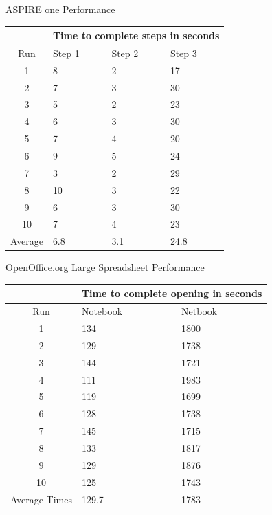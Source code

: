 \documentclass{beamer}
\begin{document}
\begin{frame}{ASPIRE one Performance}
  \begin{tabularx}{275pt}{| c | X | X | X |}
    \hline
    & \multicolumn{3}{c|}{Time to complete steps in seconds} \\ \hline
    Run          & Step 1 & Step 2 & Step 3 \\ \hline
    1            & 8      & 2      & 17     \\ \hline
    2            & 7      & 3      & 30     \\ \hline
    3            & 5      & 2      & 23     \\ \hline
    4            & 6      & 3      & 30     \\ \hline
    5            & 7      & 4      & 20     \\ \hline
    6            & 9      & 5      & 24     \\ \hline
    7            & 3      & 2      & 29     \\ \hline
    8            & 10     & 3      & 22     \\ \hline
    9            & 6      & 3      & 30     \\ \hline
    10           & 7      & 4      & 23     \\ \hline
    Average      & 6.8    & 3.1    & 24.8   \\
    \hline
  \end{tabularx}
\end{frame}

\begin{frame}{OpenOffice.org Large Spreadsheet Performance}
  \begin{tabularx}{300pt}{| c | X | X |}
    \hline
    & \multicolumn{2}{c|}{Time to complete opening in seconds} \\ \hline
    Run               & Notebook & Netbook    \\ \hline
    1                 & 134      & 1800       \\ \hline
    2                 & 129      & 1738       \\ \hline
    3                 & 144      & 1721       \\ \hline
    4                 & 111      & 1983       \\ \hline
    5                 & 119      & 1699       \\ \hline
    6                 & 128      & 1738       \\ \hline
    7                 & 145      & 1715       \\ \hline
    8                 & 133      & 1817       \\ \hline
    9                 & 129      & 1876       \\ \hline
    10                & 125      & 1743       \\ \hline
    Average Times     & 129.7    & 1783       \\
    \hline
  \end{tabularx}
\end{frame}
\end{document}
